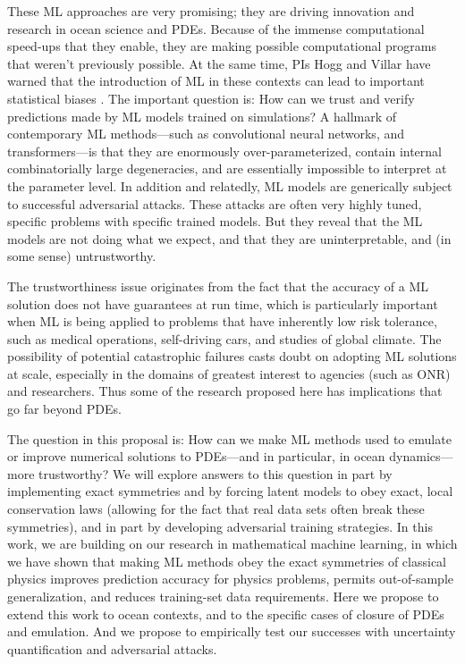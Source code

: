 \documentclass[11pt]{article}
\begin{document}
These ML approaches are very promising; they are driving innovation and research in ocean science and PDEs.
Because of the immense computational speed-ups that they enable, they are making possible computational programs that weren't previously possible.
At the same time, PIs Hogg and Villar have warned that the introduction of ML in these contexts can lead to important statistical biases \cite{goodorbad}.
The important question is: How can we trust and verify predictions made by ML models trained on simulations?
A hallmark of contemporary ML methods---such as convolutional neural networks, and transformers---is that they are enormously over-parameterized, contain internal combinatorially large degeneracies, and are essentially impossible to interpret at the parameter level.
In addition and relatedly, ML models are generically subject to successful adversarial attacks.
These attacks are often very highly tuned, specific problems with specific trained models.
But they reveal that the ML models are not doing what we expect, and that they are uninterpretable, and (in some sense) untrustworthy.

The trustworthiness issue originates from the fact that the accuracy of a ML solution does not have guarantees at run time, which is particularly important when ML is being applied to problems that have inherently low risk tolerance, such as medical operations, self-driving cars, and studies of global climate.
The possibility of potential catastrophic failures casts doubt on adopting ML solutions at scale, especially in the domains of greatest interest to agencies (such as ONR) and researchers.
Thus some of the research proposed here has implications that go far beyond PDEs.

The question in this proposal is:
How can we make ML methods used to emulate or improve numerical solutions to PDEs---and in particular, in ocean dynamics---more trustworthy?
We will explore answers to this question in part by implementing exact symmetries and by forcing latent models to obey exact, local conservation laws (allowing for the fact that real data sets often break these symmetries), and in part by developing adversarial training strategies.
In this work, we are building on our research in mathematical machine learning, in which we have shown that making ML methods obey the exact symmetries of classical physics improves prediction accuracy for physics problems, permits out-of-sample generalization, and reduces training-set data requirements.
Here we propose to extend this work to ocean contexts, and to the specific cases of closure of PDEs and emulation.
And we propose to empirically test our successes with uncertainty quantification and adversarial attacks.
\end{document}
